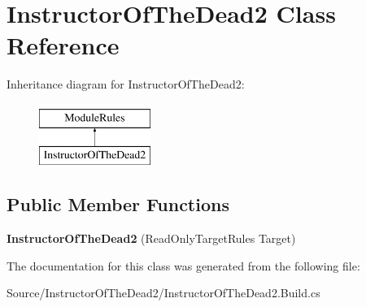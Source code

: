 \hypertarget{class_instructor_of_the_dead2}{}\section{Instructor\+Of\+The\+Dead2 Class Reference}
\label{class_instructor_of_the_dead2}
Inheritance diagram for Instructor\+Of\+The\+Dead2\+:\begin{figure}[H]
\begin{center}
\leavevmode
\includegraphics[height=2.000000cm]{class_instructor_of_the_dead2}
\end{center}
\end{figure}
\subsection*{Public Member Functions}
\begin{DoxyCompactItemize}
\item 
\mbox{\label{class_instructor_of_the_dead2_a1be84c5444e47351a8f28a62159b500f}} 
{\bfseries Instructor\+Of\+The\+Dead2} (Read\+Only\+Target\+Rules Target)
\end{DoxyCompactItemize}


The documentation for this class was generated from the following file\+:\begin{DoxyCompactItemize}
\item 
Source/\+Instructor\+Of\+The\+Dead2/Instructor\+Of\+The\+Dead2.\+Build.\+cs\end{DoxyCompactItemize}
